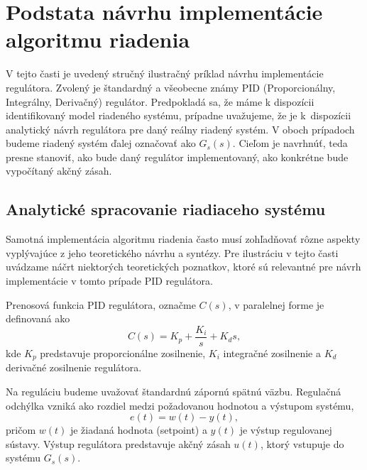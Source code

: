 
\section{Podstata návrhu implementácie algoritmu riadenia}
\label{sec:intro_example_control}

V tejto časti je uvedený stručný ilustračný príklad návrhu implementácie regulátora. Zvolený je štandardný a všeobecne známy PID (Proporcionálny, Integrálny, Derivačný) regulátor. Predpokladá sa, že máme k dispozícii identifikovaný model riadeného systému, prípadne uvažujeme, že je k~dispozícii analytický návrh regulátora pre daný reálny riadený systém. V oboch prípadoch budeme riadený systém ďalej označovať ako $G_s(s)$.
Cieľom je navrhnúť, teda presne stanoviť, ako bude daný regulátor implementovaný, ako konkrétne bude vypočítaný akčný zásah.


\subsection{Analytické spracovanie riadiaceho systému}

Samotná implementácia algoritmu riadenia často musí zohľadňovať rôzne aspekty vyplývajúce z jeho teoretického návrhu a syntézy. Pre ilustráciu v tejto časti uvádzame náčrt niektorých teoretických poznatkov, ktoré sú relevantné pre návrh implementácie v tomto prípade PID regulátora.

Prenosová funkcia PID regulátora, označme $C(s)$, v paralelnej forme je definovaná ako
\begin{equation}
    C(s) = K_p + \frac{K_i}{s} + K_d s,
    \label{eq:intro_pid_parallel}
\end{equation}
kde $K_p$ predstavuje proporcionálne zosilnenie, $K_i$ integračné zosilnenie
a $K_d$ derivačné zosilnenie regulátora.

Na reguláciu budeme uvažovať štandardnú zápornú spätnú väzbu.
Regulačná odchýlka vzniká ako rozdiel medzi požadovanou hodnotou a výstupom systému,
\begin{equation}
    e(t) = w(t) - y(t),
    \label{eq:intro_error_cont}
\end{equation}
pričom $w(t)$ je žiadaná hodnota (setpoint) a $y(t)$ je výstup regulovanej sústavy.
Výstup regulátora predstavuje akčný zásah $u(t)$, ktorý vstupuje do systému $G_s(s)$.

